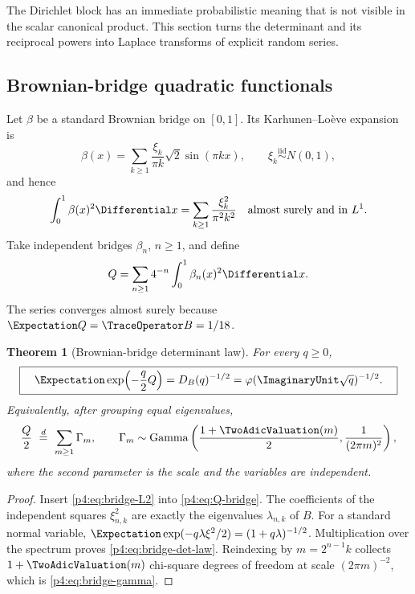 \documentclass[11pt]{article}
\newtheorem{theorem}{Theorem}[section]
\theoremstyle{definition}
\theoremstyle{remark}
\newcommand{\phiF}{\varphi}
\begin{document}
The Dirichlet block has an immediate probabilistic meaning that is not visible in the
scalar canonical product.  This section turns the determinant and its reciprocal
powers into Laplace transforms of explicit random series.

\subsection{Brownian-bridge quadratic functionals}

Let \(\beta\) be a standard Brownian bridge on \([0,1]\).  Its Karhunen--Lo\`eve expansion is~\cite{p4:Karhunen1947}
\begin{equation}
 \beta(x)=\sum_{k\ge1}\frac{\xi_k}{\pi k}\sqrt2\sin(\pi kx),
 \qquad \xi_k\stackrel{\mathrm{iid}}{\sim}N(0,1),
 \label{p4:eq:bridge-KL}
\end{equation}
and hence
\begin{equation}
 \int_0^1\beta(x)^2\Differential x
 =\sum_{k\ge1}\frac{\xi_k^2}{\pi^2k^2}
 \quad\text{almost surely and in }L^1.
 \label{p4:eq:bridge-L2}
\end{equation}
Take independent bridges \(\beta_n\), \(n\ge1\), and define
\begin{equation}
 Q=\sum_{n\ge1}4^{-n}\int_0^1\beta_n(x)^2\Differential x.
 \label{p4:eq:Q-bridge}
\end{equation}
The series converges almost surely because
\(\Expectation Q=\TraceOperator B=1/18\).

\begin{theorem}[Brownian-bridge determinant law]
\label{p4:thm:bridge}
For every \(q\ge0\),
\begin{equation}
 \boxed{\quad
 \Expectation\exp\!\left(-\frac q2Q\right)=D_B(q)^{-1/2}
 =\phiF(\ImaginaryUnit\sqrt q)^{-1/2}.
 \quad}
 \label{p4:eq:bridge-det-law}
\end{equation}
Equivalently, after grouping equal eigenvalues,
\begin{equation}
 \frac Q2\ \stackrel{d}=\
 \sum_{m\ge1}\Gamma_m,
 \qquad
 \Gamma_m\sim\operatorname{Gamma}
 \left(\frac{1+\TwoAdicValuation(m)}2,\frac1{(2\pi m)^2}\right),
 \label{p4:eq:bridge-gamma}
\end{equation}
where the second parameter is the scale and the variables are independent.
\end{theorem}

\begin{proof}
Insert \eqref{p4:eq:bridge-L2} into \eqref{p4:eq:Q-bridge}.  The coefficients of the
independent squares \(\xi_{n,k}^2\) are exactly the eigenvalues
\(\lambda_{n,k}\) of \(B\).  For a standard normal variable,
\(\Expectation\exp(-q\lambda\xi^2/2)=(1+q\lambda)^{-1/2}\).  Multiplication over the spectrum
proves \eqref{p4:eq:bridge-det-law}.  Reindexing by \(m=2^{n-1}k\) collects
\(1+\TwoAdicValuation(m)\) chi-square degrees of freedom at scale \((2\pi m)^{-2}\), which is
\eqref{p4:eq:bridge-gamma}.
\end{proof}
\end{document}
